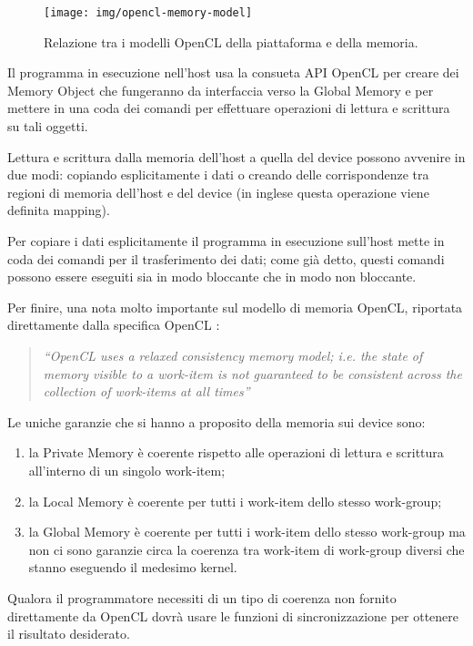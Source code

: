 \documentclass[12pt,a4paper,oneside]{book}
\begin{document}
\begin{figure}[p]
\begin{center}
\texttt{[image: img/opencl-memory-model]}
\caption{Relazione tra i modelli \ac{OpenCL} della piattaforma e della memoria.\label{fig:opencl-memory-model}}
\end{center}
\end{figure}

Il programma in esecuzione nell'host usa la consueta \ac{API} \ac{OpenCL} per creare dei Memory Object che fungeranno da interfaccia verso la Global Memory e per mettere in una coda dei comandi per effettuare operazioni di lettura e scrittura su tali oggetti.

Lettura e scrittura dalla memoria dell'host a quella del device possono avvenire in due modi: copiando esplicitamente i dati o creando delle corrispondenze tra regioni di memoria dell'host e del device (in inglese questa operazione viene definita mapping).

Per copiare i dati esplicitamente il programma in esecuzione sull'host mette in coda dei comandi per il trasferimento dei dati; come già detto, questi comandi possono essere eseguiti sia in modo bloccante che in modo non bloccante.

Per finire, una nota molto importante sul modello di memoria \ac{OpenCL}, riportata direttamente dalla specifica \ac{OpenCL} \cite{bib:opencl}:

\begin{quote}
\textit{``OpenCL uses a relaxed consistency memory model; i.e. the state of memory visible to a work-item is not guaranteed to be consistent across the collection of work-items at all times''}
\end{quote}

Le uniche garanzie che si hanno a proposito della memoria sui device sono:
\begin{enumerate}
\item la Private Memory è coerente rispetto alle operazioni di lettura e scrittura all'interno di un singolo work-item;
\item la Local Memory è coerente per tutti i work-item dello stesso work-group;
\item la Global Memory è coerente per tutti i work-item dello stesso work-group ma non ci sono garanzie circa la coerenza tra work-item di work-group diversi che stanno eseguendo il medesimo kernel.
\end{enumerate}

Qualora il programmatore necessiti di un tipo di coerenza non fornito direttamente da \ac{OpenCL} dovrà usare le funzioni di sincronizzazione per ottenere il risultato desiderato.
\end{document}

